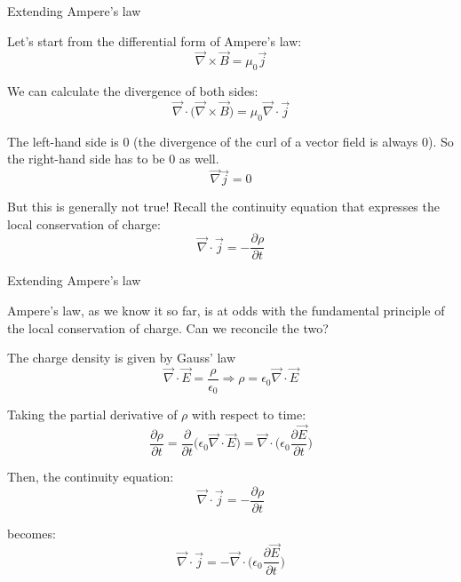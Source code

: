 %
%
%

\begin{frame}{Extending Ampere's law}

Let's start from the differential form of Ampere's law:
\begin{equation*}
  \vec{\nabla} \times \vec{B} = \mu_0 \vec{j}
\end{equation*}

We can calculate the divergence of both sides:
\begin{equation*}
  \vec{\nabla} \cdot \Big( \vec{\nabla} \times \vec{B} \Big) = \mu_0 \vec{\nabla} \cdot \vec{j}
\end{equation*}

The left-hand side is 0 (the divergence of the curl of a vector field is always 0).
So the right-hand side has to be 0 as well.
\begin{equation*}
  \vec{\nabla} \vec{j} = 0
\end{equation*}

But this is generally not true!
Recall the continuity equation that expresses the local conservation of charge:
\begin{equation*}
  \vec{\nabla} \cdot \vec{j} = -\frac{\partial \rho}{\partial t}
\end{equation*}

\end{frame}

%
%
%

\begin{frame}{Extending Ampere's law}

Ampere's law, as we know it so far, is at odds with the fundamental principle of
the local conservation of charge. Can we reconcile the two?

The charge density is given by Gauss' law
\begin{equation*}
  \vec{\nabla} \cdot \vec{E} = \frac{\rho}{\epsilon_0} \Rightarrow \rho =
   \epsilon_0 \vec{\nabla} \cdot \vec{E}
\end{equation*}

Taking the partial derivative of $\rho$ with respect to time:
\begin{equation*}
  \frac{\partial \rho}{\partial t} =
   \frac{\partial}{\partial t} \Big( \epsilon_0 \vec{\nabla} \cdot \vec{E} \Big) =
   \vec{\nabla} \cdot \Big( \epsilon_0 \frac{\partial \vec{E}}{\partial t} \Big)
\end{equation*}

Then, the continuity equation:
\begin{equation*}
  \vec{\nabla} \cdot \vec{j} = -\frac{\partial \rho}{\partial t}
\end{equation*}

becomes:
\begin{equation*}
  \vec{\nabla} \cdot \vec{j} =
    - \vec{\nabla} \cdot \Big( \epsilon_0 \frac{\partial \vec{E}}{\partial t} \Big)
\end{equation*}

\end{frame}


